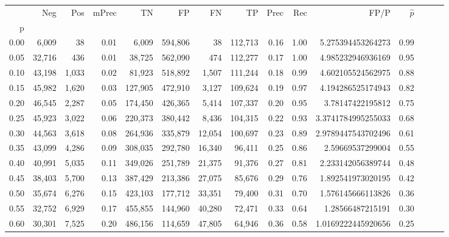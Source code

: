 \begin{tabular}{rrrrrrrrrrrrrrr}
\toprule
{} &     Neg &    Pos & mPrec &       TN &       FP &       FN &       TP &  Prec &   Rec &                  FP/P & $\hat{p}$ \\
p    &         &        &       &          &          &          &          &       &       &                       &           \\
\midrule
0.00 &   6,009 &     38 &  0.01 &    6,009 &  594,806 &       38 &  112,713 &  0.16 &  1.00 &     5.275394453264273 &      0.99 \\
0.05 &  32,716 &    436 &  0.01 &   38,725 &  562,090 &      474 &  112,277 &  0.17 &  1.00 &     4.985232946936169 &      0.95 \\
0.10 &  43,198 &  1,033 &  0.02 &   81,923 &  518,892 &    1,507 &  111,244 &  0.18 &  0.99 &     4.602105524562975 &      0.88 \\
0.15 &  45,982 &  1,620 &  0.03 &  127,905 &  472,910 &    3,127 &  109,624 &  0.19 &  0.97 &     4.194286525174943 &      0.82 \\
0.20 &  46,545 &  2,287 &  0.05 &  174,450 &  426,365 &    5,414 &  107,337 &  0.20 &  0.95 &      3.78147422195812 &      0.75 \\
0.25 &  45,923 &  3,022 &  0.06 &  220,373 &  380,442 &    8,436 &  104,315 &  0.22 &  0.93 &    3.3741784995255033 &      0.68 \\
0.30 &  44,563 &  3,618 &  0.08 &  264,936 &  335,879 &   12,054 &  100,697 &  0.23 &  0.89 &    2.9789447543702496 &      0.61 \\
0.35 &  43,099 &  4,286 &  0.09 &  308,035 &  292,780 &   16,340 &   96,411 &  0.25 &  0.86 &      2.59669537299004 &      0.55 \\
0.40 &  40,991 &  5,035 &  0.11 &  349,026 &  251,789 &   21,375 &   91,376 &  0.27 &  0.81 &     2.233142056389744 &      0.48 \\
0.45 &  38,403 &  5,700 &  0.13 &  387,429 &  213,386 &   27,075 &   85,676 &  0.29 &  0.76 &     1.892541973020195 &      0.42 \\
0.50 &  35,674 &  6,276 &  0.15 &  423,103 &  177,712 &   33,351 &   79,400 &  0.31 &  0.70 &     1.576145666113826 &      0.36 \\
0.55 &  32,752 &  6,929 &  0.17 &  455,855 &  144,960 &   40,280 &   72,471 &  0.33 &  0.64 &      1.28566487215191 &      0.30 \\
0.60 &  30,301 &  7,525 &  0.20 &  486,156 &  114,659 &   47,805 &   64,946 &  0.36 &  0.58 &    1.0169222445920656 &      0.25 \\

\end{tabular}

